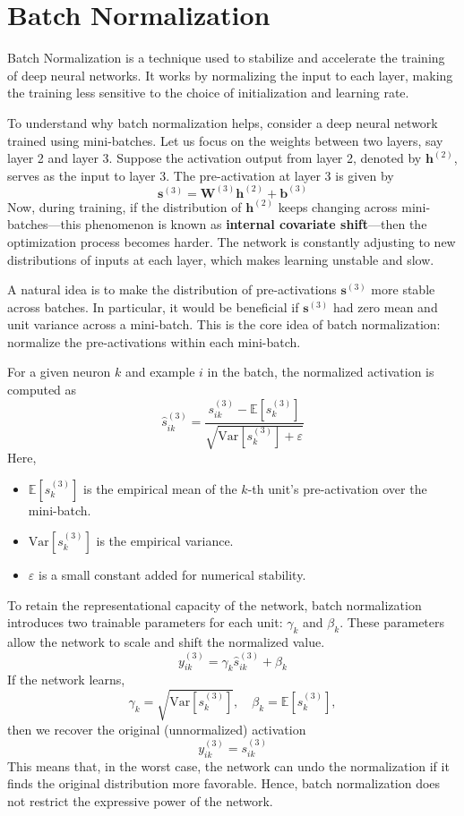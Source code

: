 \section{Batch Normalization}

Batch Normalization is a technique used to stabilize and accelerate the training of deep neural networks. It works by normalizing the input to each layer, making the training less sensitive to the choice of initialization and learning rate.

To understand why batch normalization helps, consider a deep neural network trained using mini-batches. Let us focus on the weights between two layers, say layer 2 and layer 3. Suppose the activation output from layer 2, denoted by $\mathbf{h}^{(2)}$, serves as the input to layer 3. The pre-activation at layer 3 is given by
\[
\mathbf{s}^{(3)} = \mathbf{W}^{(3)} \mathbf{h}^{(2)} + \mathbf{b}^{(3)}
\]
Now, during training, if the distribution of $\mathbf{h}^{(2)}$ keeps changing across mini-batches—this phenomenon is known as \textbf{internal covariate shift}—then the optimization process becomes harder. The network is constantly adjusting to new distributions of inputs at each layer, which makes learning unstable and slow.

A natural idea is to make the distribution of pre-activations $\mathbf{s}^{(3)}$ more stable across batches. In particular, it would be beneficial if $\mathbf{s}^{(3)}$ had zero mean and unit variance across a mini-batch. This is the core idea of batch normalization: normalize the pre-activations within each mini-batch.

For a given neuron $k$ and example $i$ in the batch, the normalized activation is computed as
\[
\hat{s}_{ik}^{(3)} = \frac{s_{ik}^{(3)} - \mathbb{E}[s_k^{(3)}]}{\sqrt{\text{Var}[s_k^{(3)}] + \varepsilon}}
\]
Here,
\begin{itemize}
  \item $\mathbb{E}[s_k^{(3)}]$ is the empirical mean of the $k$-th unit’s pre-activation over the mini-batch.
  \item $\text{Var}[s_k^{(3)}]$ is the empirical variance.
  \item $\varepsilon$ is a small constant added for numerical stability.
\end{itemize}

To retain the representational capacity of the network, batch normalization introduces two trainable parameters for each unit: $\gamma_k$ and $\beta_k$. These parameters allow the network to scale and shift the normalized value.
\[
y_{ik}^{(3)} = \gamma_k \hat{s}_{ik}^{(3)} + \beta_k
\]
If the network learns,
\[
\gamma_k = \sqrt{\text{Var}[s_k^{(3)}]}, \quad \beta_k = \mathbb{E}[s_k^{(3)}],
\]
then we recover the original (unnormalized) activation
\[
y_{ik}^{(3)} = s_{ik}^{(3)}
\]
This means that, in the worst case, the network can undo the normalization if it finds the original distribution more favorable. Hence, batch normalization does not restrict the expressive power of the network.

